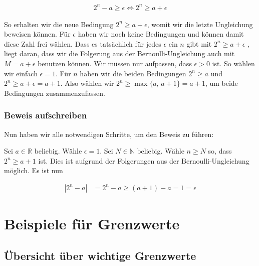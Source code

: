 \documentclass[fontsize=9pt,
               parskip=half-,
               DIV=14,
               listof=chapterentry,
               tocflat]{scrbook}
\begin{document}
\begin{align*}
2^{n}-a\geq \epsilon \iff 2^{n}\geq a+\epsilon 
\end{align*}

So erhalten wir die neue Bedingung $2^{n}\geq a+\epsilon $, womit wir die letzte Ungleichung beweisen können. Für $\epsilon $ haben wir noch keine Bedingungen und können damit diese Zahl frei wählen. Dass es tatsächlich für jedes $\epsilon $ ein $n$ gibt mit $2^{n}\geq a+\epsilon $ , liegt daran, dass wir die Folgerung aus der Bernoulli-Ungleichung auch mit $M=a+\epsilon $ benutzen können. Wir müssen nur aufpassen, dass $\epsilon >0$ ist. So wählen wir einfach $\epsilon =1$. Für $n$ haben wir die beiden Bedingungen $2^{n}\geq a$ und $2^{n}\geq a+\epsilon =a+1$. Also wählen wir $2^{n}\geq \max\{a,\,a+1\}=a+1$, um beide Bedingungen zusammenzufassen.

\subsection{Beweis aufschreiben}

Nun haben wir alle notwendigen Schritte, um den Beweis zu führen:

\begin{proof*}
Sei $a\in \mathbb {R} $ beliebig. Wähle $\epsilon =1$. Sei $N\in \mathbb {N} $ beliebig. Wähle $n\geq N$ so, dass $2^{n}\geq a+1$ ist. Dies ist aufgrund der Folgerungen aus der Bernoulli-Ungleichung möglich. Es ist nun

\begin{align*}
|2^{n}-a|&=2^{n}-a\geq (a+1)-a=1=\epsilon 
\end{align*}

\end{proof*}

\chapter{Beispiele für Grenzwerte}

\section{Übersicht über wichtige Grenzwerte}
\end{document}

